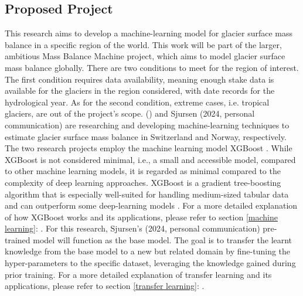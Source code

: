 \subsection{Proposed Project}\label{proposed project}
This research aims to develop a machine-learning model for glacier surface mass balance in a specific region of the world. This work will be part of the larger, ambitious Mass Balance Machine project, which aims to model glacier surface mass balance globally. There are two conditions to meet for the region of interest. The first condition requires data availability, meaning enough stake data is available for the glaciers in the region considered, with date records for the hydrological year. As for the second condition, extreme cases, i.e. tropical glaciers, are out of the project's scope. \citeauthor{van-der-meer-2024} (\citeyear{van-der-meer-2024}) and Sjursen (2024, personal communication) are researching and developing machine-learning techniques to estimate glacier surface mass balance in Switzerland and Norway, respectively. The two research projects employ the machine learning model XGBoost \cite{chen-2016}. While XGBoost is not considered minimal, i.e., a small and accessible model, compared to other machine learning models, it is regarded as minimal compared to the complexity of deep learning approaches. XGBoost is a gradient tree-boosting algorithm that is especially well-suited for handling medium-sized tabular data and can outperform some deep-learning models \cite{shwartz-ziv-2022}. For a more detailed explanation of how XGBoost works and its applications, please refer to section \ref{machine learning}: . For this research, Sjursen's (2024, personal communication) pre-trained model will function as the base model. The goal is to transfer the learnt knowledge from the base model to a new but related domain by fine-tuning the hyper-parameters to the specific dataset, leveraging the knowledge gained during prior training. For a more detailed explanation of transfer learning and its applications, please refer to section \ref{transfer learning}: .


